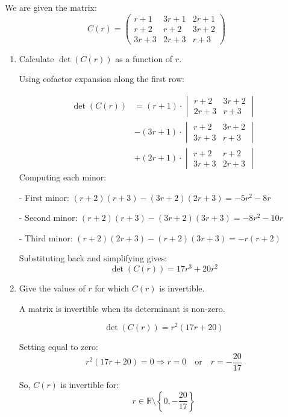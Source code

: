 \documentclass[12pt]{article}
\begin{document}
\begin{answerbox}
We are given the matrix:
$$
C(r) = \begin{pmatrix}
r+1 & 3r+1 & 2r+1 \\
r+2 & r+2 & 3r+2 \\
3r+3 & 2r+3 & r+3
\end{pmatrix}
$$

\begin{enumerate}
\item Calculate $\det(C(r))$ as a function of $r$.

Using cofactor expansion along the first row:

$$
\begin{align*}
\det(C(r)) &= (r+1) \cdot \begin{vmatrix} r+2 & 3r+2 \\ 2r+3 & r+3 \end{vmatrix} \\
&- (3r+1) \cdot \begin{vmatrix} r+2 & 3r+2 \\ 3r+3 & r+3 \end{vmatrix} \\
&+ (2r+1) \cdot \begin{vmatrix} r+2 & r+2 \\ 3r+3 & 2r+3 \end{vmatrix}
\end{align*}
$$
Computing each minor:

    
- First minor: $(r+2)(r+3) - (3r+2)(2r+3) = -5r^2 - 8r$
    
- Second minor: $(r+2)(r+3) - (3r+2)(3r+3) = -8r^2 - 10r$
    
- Third minor: $(r+2)(2r+3) - (r+2)(3r+3) = -r(r+2)$


Substituting back and simplifying gives:
$$
\det(C(r)) = 17r^3 + 20r^2
$$

\item Give the values of $r$ for which $C(r)$ is invertible.

A matrix is invertible when its determinant is non-zero.

$$
\det(C(r)) = r^2(17r + 20)
$$

Setting equal to zero:
$$
r^2(17r + 20) = 0 \Rightarrow r = 0 \quad \text{or} \quad r = -\frac{20}{17}
$$

So, $C(r)$ is invertible for:
$$
\boxed{r \in \mathbb{R} \setminus \left\{0, -\frac{20}{17}\right\}}
$$
\end{enumerate}
\end{answerbox}
\end{document}
